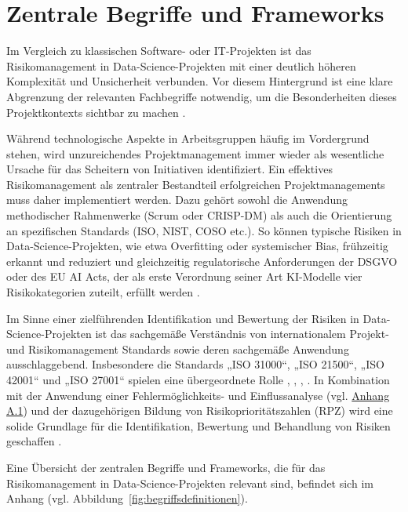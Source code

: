 \section{Zentrale Begriffe und Frameworks} \label{sec:begriffe}

Im Vergleich zu klassischen Software- oder IT-Projekten ist das Risikomanagement 
in Data-Science-Projekten mit einer deutlich höheren Komplexität und Unsicherheit verbunden. 
Vor diesem Hintergrund ist eine klare Abgrenzung der relevanten Fachbegriffe notwendig, 
um die Besonderheiten dieses Projektkontexts sichtbar zu machen \citep{holtkemper_risk_2023}.

Während technologische Aspekte in Arbeitsgruppen häufig im Vordergrund stehen, 
wird unzureichendes Projektmanagement immer wieder als wesentliche Ursache für das Scheitern von Initiativen identifiziert. 
Ein effektives Risikomanagement als zentraler Bestandteil erfolgreichen Projektmanagements muss daher implementiert werden. 
Dazu gehört sowohl die Anwendung methodischer Rahmenwerke (Scrum oder CRISP-DM) als 
auch die Orientierung an spezifischen Standards (ISO, NIST, COSO etc.). 
So können typische Risiken in Data-Science-Projekten, wie etwa Overfitting oder systemischer Bias, 
frühzeitig erkannt und reduziert und gleichzeitig regulatorische Anforderungen der DSGVO oder des EU AI Acts, 
der als erste Verordnung seiner Art KI-Modelle vier Risikokategorien zuteilt, erfüllt werden \citep{holtkemper_risk_2023,EUAIAct2024}.

Im Sinne einer zielführenden Identifikation und Bewertung der Risiken in Data-Science-Projekten 
ist das sachgemäße Verständnis von internationalem Projekt- und Risikomanagement 
Standards sowie deren sachgemäße Anwendung ausschlaggebend. Insbesondere die Standards „ISO 31000“, „ISO 21500“, „ISO 42001“ und „ISO 27001“ spielen eine übergeordnete Rolle \cite{ISO_2018}, \cite{ISO_2023}, \cite{ISO_2021}, \cite{Kersten_27001_2019}.
In Kombination mit der Anwendung einer Fehlermöglichkeits- und Einflussanalyse (vgl. \hyperref[fig:fmea_bewertung]{Anhang A.1})
 und der dazugehörigen Bildung von Risikoprioritätszahlen (RPZ) wird eine solide Grundlage für die Identifikation, Bewertung und Behandlung von Risiken geschaffen \cite{Bundesministerium_2018}.

Eine Übersicht der zentralen Begriffe und Frameworks, 
die für das Risikomanagement in Data-Science-Projekten relevant sind,  
befindet sich im Anhang (vgl. Abbildung~\ref{fig:begriffsdefinitionen}).


